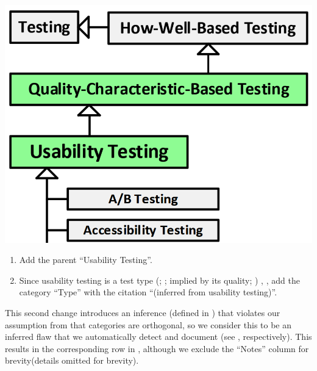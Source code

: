\begin{minipage}{0.45\linewidth}
    \vspace{0.5cm}
    \includegraphics[width=\linewidth]{assets/images/a-b testing 2.png}
    \label{fig:Firesmith-A-B-Testing}
    \vspace{0.5cm}
\end{minipage}
\begin{minipage}{\ifnotpaper 0.53\else 0.5\fi\linewidth}
    \begin{enumerate}
        \item Add the parent ``Usability Testing''.
        \item Since usability testing is a test type \ifnotpaper
                  (\citealp[pp.~22, 26\=/27]{IEEE2022};
                  \citeyear[pp.~7, 40, Tab.~A.1]{IEEE2021};
                  implied by its quality; \citealp[p.~53]{Firesmith2015})\else
                  \cite[pp.~22, 26\=/27]{IEEE2022},
                  \cite[pp.~7, 40, Tab.~A.1]{IEEE2021}\fi, add the category
              ``Type'' with the citation ``(inferred from usability testing)''.
    \end{enumerate}
\end{minipage}
This second change introduces an inference \ifnotpaper (defined in )
\fi that violates our assumption \ifnotpaper from  \fi that
categories are orthogonal, so we consider this to be an inferred flaw that we
automatically detect and document \ifnotpaper (see , respectively). This results in the corresponding row
    in , although we exclude the ``Notes''
    column for brevity\else (details omitted for brevity)\fi.


